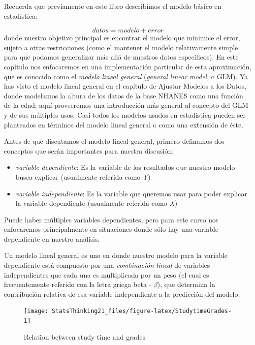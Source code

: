 \documentclass[
  12pt,
]{book}
\providecommand{\tightlist}{%
  \setlength{\itemsep}{0pt}\setlength{\parskip}{0pt}}
\begin{document}
Recuerda que previamente en este libro describimos el modelo básico en estadística:

\[
datos = modelo + error
\]
donde nuestro objetivo principal es encontrar el modelo que minimice el error, sujeto a otras restricciones (como el mantener el modelo relativamente simple para que podamos generalizar más allá de nuestros datos específicos). En este capítulo nos enfocaremos en una implementación particular de esta aproximación, que es conocido como el \emph{modelo lineal general} (\emph{general linear model}, o GLM). Ya has visto el modelo lineal general en el capítulo de Ajustar Modelos a los Datos, donde modelamos la altura de los datos de la base NHANES como una función de la edad; aquí proveeremos una introducción más general al concepto del GLM y de sus múltiples usos. Casi todos los modelos usados en estadística pueden ser planteados en términos del modelo lineal general o como una extensión de éste.

Antes de que discutamos el modelo lineal general, primero definamos dos conceptos que serán importantes para nuestra discusión:

\begin{itemize}
\tightlist
\item
  \emph{variable dependiente}: Es la variable de los resultados que nuestro modelo busca explicar (usualmente referida como \emph{Y})
\item
  \emph{variable independiente}: Es la variable que queremos usar para poder explicar la variable dependiente (usualmente referida como \emph{X})
\end{itemize}

Puede haber múltiples variables dependientes, pero para este curso nos enfocaremos principalmente en situaciones donde sólo hay una variable dependiente en nuestro análisis.

Un modelo lineal general es uno en donde nuestro modelo para la variable dependiente está compuesto por una \emph{combinación lineal} de variables independientes que cada una es multiplicada por un peso (el cual es frecuentemente referido con la letra griega beta - \(\beta\)), que determina la contribución relativa de esa variable independiente a la predicción del modelo.

\begin{figure}
\texttt{[image: StatsThinking21\_files/figure-latex/StudytimeGrades-1]} \caption{Relation between study time and grades}\label{fig:StudytimeGrades}
\end{figure}
\end{document}
